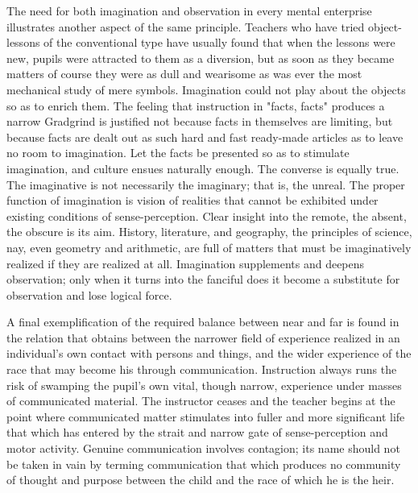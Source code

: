 \documentclass[showtrims,ustradepaper]{memoir}
\begin{document}
The need for both imagination and observation in every mental enterprise
illustrates another aspect of the same principle. Teachers who have
tried object-lessons of the conventional type have usually found that
when the lessons were new, pupils were attracted to them as a diversion,
but as soon as they became matters of course they were as dull and
wearisome as was ever the most mechanical study of mere symbols.
Imagination could not play about the objects so as to enrich them. The
feeling that instruction in "facts, facts" produces a narrow Gradgrind
is justified not because facts in themselves are limiting, but because
facts are dealt
out
as such hard and fast ready-made articles as to leave no room to
imagination. Let the facts be presented so as to stimulate imagination,
and culture ensues naturally enough. The converse is equally true. The
imaginative is not necessarily the imaginary; that is, the unreal. The
proper function of imagination is vision of realities that cannot be
exhibited under existing conditions of sense-perception. Clear insight
into the remote, the absent, the obscure is its aim. History,
literature, and geography, the principles of science, nay, even geometry
and arithmetic, are full of matters that must be imaginatively realized
if they are realized at all. Imagination supplements and deepens
observation; only when it turns into the fanciful does it become a
substitute for observation and lose logical force.


A final exemplification of the required balance between near and far is
found in the relation that obtains between the narrower field of
experience realized in an individual's own contact with persons and
things, and the wider experience of the race that may become his through
communication. Instruction always runs the risk of swamping the pupil's
own vital, though narrow, experience under masses of communicated
material. The instructor ceases and the teacher begins at the point
where communicated matter stimulates into fuller and more significant
life that which has entered by the strait and narrow gate of
sense-perception and motor activity. Genuine communication involves
contagion; its name should not be taken in vain by terming communication
that which produces no community of thought and purpose between the
child and the race of which he is the
heir.
\end{document}
